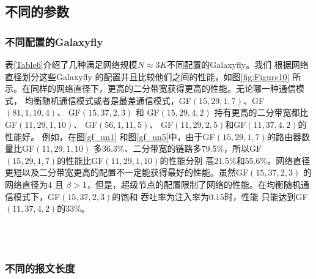 \subsection{不同的参数}

\subsubsection{不同配置的Galaxyfly}
表\ref{Table6}介绍了几种满足网络规模$N\approx 3K$不同配置的Galaxyfly。我们
根据网络直径划分这些Galaxyfly 的配置并且比较他们之间的性能，如图\ref{fig:Figure10}
所示。在同样的网络直径下，更高的二分带宽获得更高的性能。无论哪一种通信模式，
均衡随机通信模式或者是最差通信模式，GF$(15,29,1,7)$、GF$(81,1,10,4)$、 GF$(15,37,2,3)$ 和 GF$(15,29,4,2)$
持有更高的二分带宽都比GF$(11,29,1,10)$、 GF$(56,1,11,5)$、 GF$(11,29,2,5)$和GF$(11,37,4,2)$的性能好。
例如，在图\ref{gf_un1} 和图\ref{gf_un5}中，由于GF$(15,29,1,7)$的路由器数量比GF$(11,29,1,10)$
多36.3\%、二分带宽的链路多79.5\%，所以GF$(15,29,1,7)$的性能比GF$(11,29,1,10)$的性能分别
高21.5\%和55.6\%。网络直径更短以及二分带宽更高的配置不一定能获得最好的性能。虽然GF$(15,37,2,3)$ 的网络直径为4 且
$\beta>1$，但是，超级节点的配置限制了网络的性能。在均衡随机通信模式下，GF$(15,37,2,3)$的饱和
吞吐率为注入率为0.15时，性能
只能达到GF$(11,37,4,2)$的33\%。

\begin{figure*}[t]
  \centering
  \begin{minipage}[t]{\textwidth}
   \centering
    \\
    \\
  \caption{不同参数配置的Galaxyfly的性能比较 (a)--(d) 均衡随机通信模式； (e)--(h) 最差情况通信模式。}
  \label{fig:Figure10}
  \end{minipage}
\end{figure*}

\subsubsection{不同的报文长度}

